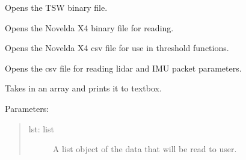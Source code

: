 \documentclass[letterpaper,10pt,english]{sphinxmanual}
\begin{document}

\begin{fulllineitems}
\label{\detokenize{Library GUI:library_gui.open_TSW_bin}}
Opens the TSW binary file.

\end{fulllineitems}


\begin{fulllineitems}
\label{\detokenize{Library GUI:library_gui.open_x4_bin}}
Opens the Novelda X4 binary file for reading.

\end{fulllineitems}


\begin{fulllineitems}
\label{\detokenize{Library GUI:library_gui.open_x4_csv}}
Opens the Novelda X4 csv file for use in threshold functions.

\end{fulllineitems}


\begin{fulllineitems}
\label{\detokenize{Library GUI:library_gui.openfile}}
Opens the csv file for reading lidar and IMU packet parameters.

\end{fulllineitems}


\begin{fulllineitems}
\label{\detokenize{Library GUI:library_gui.print_list}}
Takes in an array and prints it to textbox.

Parameters:
\begin{quote}
\begin{description}
\item[{lst: list}] \leavevmode
A list object of the data that will be read to user.

\end{description}
\end{quote}

\end{fulllineitems}
\end{document}
